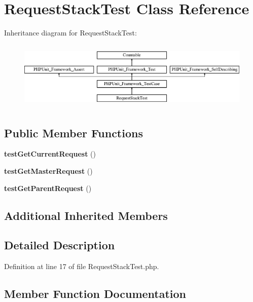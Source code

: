 \section{Request\+Stack\+Test Class Reference}
\label{class_symfony_1_1_component_1_1_http_foundation_1_1_tests_1_1_request_stack_test}
Inheritance diagram for Request\+Stack\+Test\+:\begin{figure}[H]
\begin{center}
\leavevmode
\includegraphics[height=3.303835cm]{class_symfony_1_1_component_1_1_http_foundation_1_1_tests_1_1_request_stack_test}
\end{center}
\end{figure}
\subsection*{Public Member Functions}
\begin{DoxyCompactItemize}
\item 
{\bf test\+Get\+Current\+Request} ()
\item 
{\bf test\+Get\+Master\+Request} ()
\item 
{\bf test\+Get\+Parent\+Request} ()
\end{DoxyCompactItemize}
\subsection*{Additional Inherited Members}


\subsection{Detailed Description}


Definition at line 17 of file Request\+Stack\+Test.\+php.



\subsection{Member Function Documentation}
